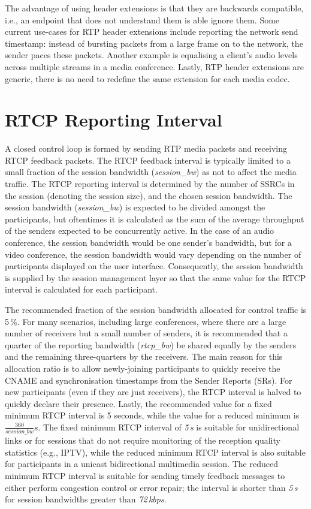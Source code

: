 The advantage of using header extensions is that they are backwards
compatible, i.e., an endpoint that does not understand them is able ignore
them. Some current use-cases for RTP header extensions include reporting the
network send timestamp: instead of bursting packets from a large frame on to
the network, the sender paces these packets.  Another example is equalising a
client's audio levels across multiple streams in a media conference. Lastly,
RTP header extensions are generic, there is no need to redefine the same extension
for each media codec.

\section{RTCP Reporting Interval}

A closed control loop is formed by sending RTP media packets and receiving
RTCP feedback packets. The RTCP feedback interval is typically limited to a
small fraction of the session bandwidth (\emph{session\_bw}) as not to affect the media traffic.
The RTCP reporting interval is determined by the number of SSRCs in the
session (denoting the session size), and the chosen session bandwidth. The
session bandwidth (\emph{session\_bw}) is expected to be divided amongst the participants, but
oftentimes it is calculated as the sum of the average throughput of the
senders expected to be concurrently active. In the case of an audio conference,
the session bandwidth would be one sender's bandwidth, but for a video
conference, the session bandwidth would vary depending on the number of participants displayed on
the user interface. Consequently, the session bandwidth is supplied by the
session management layer so that the same value for the RTCP interval is calculated for each participant.


The recommended fraction of the session bandwidth allocated for control
traffic is 5\,\%. For many scenarios, including large conferences, where there
are a large number of receivers but a small number of senders, it is
recommended that a quarter of the reporting bandwidth (\emph{rtcp\_bw}) be
shared equally by the senders and the remaining three-quarters by the receivers. The
main reason for this allocation ratio is to allow newly-joining participants to quickly receive the
CNAME and synchronisation timestamps from the Sender Reports (SRs). 
For new participants (even if they are just receivers), the RTCP
interval is halved to quickly declare their presence.  Lastly, the recommended
value for a fixed minimum RTCP interval is 5 seconds, while the value for a
reduced minimum is $\frac{360}{session\_bw}s$.  The fixed minimum RTCP
interval of \emph{5\,s} is suitable for unidirectional links or for sessions
that do not require monitoring of the reception quality statistics (e.g., IPTV),
while the reduced minimum RTCP interval is also suitable for participants in a
unicast bidirectional multimedia session. The reduced minimum RTCP interval
is suitable for sending timely feedback messages to either perform congestion
control or error repair; the interval is shorter than \emph{5\,s} for session
bandwidths greater than \emph{72\,kbps}.

